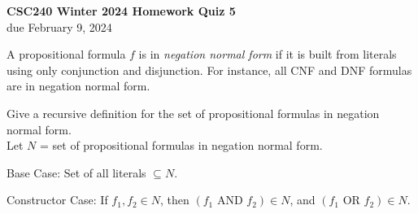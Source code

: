 \documentclass[11pt]{article}
\newcommand{\aand}{\,\,\mathrm{AND}\,\,}
\newcommand{\oor}{\,\,\mathrm{OR}\,\,}
\begin{document}
\begin{center}
{\bf \Large \bf CSC240 Winter 2024 Homework Quiz 5}\\
due February 9, 2024
\end{center}

A propositional formula $f$ is in \textit{negation normal form} if it is built from literals using only conjunction and disjunction.
For instance, all CNF and DNF formulas are in negation normal form.

Give a recursive definition for the set of propositional formulas in negation normal form.\\

Let $N$ = set of propositional formulas in negation normal form.

Base Case: Set of all literals $\subseteq N$.

Constructor Case: If $f_1, f_2 \in N$, then $(f_1 \aand f_2) \in N$, and $(f_1 \oor f_2) \in N$.
\end{document}

